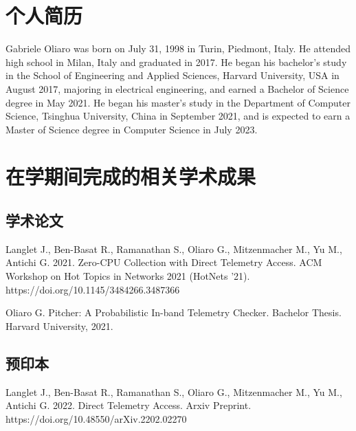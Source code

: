
\begin{resume}

  \section*{个人简历}

  Gabriele Oliaro was born on July 31, 1998 in Turin, Piedmont, Italy. He attended high school in Milan, Italy and graduated in 2017. He began his bachelor’s study in the School of Engineering and Applied Sciences, Harvard University, USA in August 2017, majoring in electrical engineering, and earned a Bachelor of Science degree in May 2021. He began his master’s study in the Department of Computer Science, Tsinghua University, China in September 2021, and is expected to earn a Master of Science degree in Computer Science in July 2023.


  \section*{在学期间完成的相关学术成果}

  \subsection*{学术论文}

  \begin{achievements}
    \item Langlet J., Ben-Basat R., Ramanathan S., Oliaro G., Mitzenmacher M., Yu M., Antichi G. 2021. Zero-CPU Collection with Direct Telemetry Access. ACM Workshop on Hot Topics in Networks 2021 (HotNets '21). https://doi.org/10.1145/3484266.3487366
    \item Oliaro G. Pitcher: A Probabilistic In-band Telemetry Checker. Bachelor Thesis. Harvard University, 2021.
  \end{achievements}


  \subsection*{预印本}

  \begin{achievements}
    \item Langlet J., Ben-Basat R., Ramanathan S., Oliaro G., Mitzenmacher M., Yu M., Antichi G. 2022. Direct Telemetry Access. Arxiv Preprint. https://doi.org/10.48550/arXiv.2202.02270
  \end{achievements}

\end{resume}
